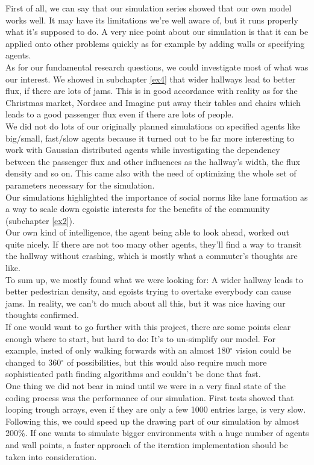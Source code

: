 
First of all, we can say that our simulation series showed that our own model works well. It may have its limitations we're well aware of, but it runs properly what it's supposed to do.
A very nice point about our simulation is that it can be applied onto other problems quickly as for example by adding walls or specifying agents.\\

\noi As for our fundamental research questions, we could investigate most of what was our interest. We showed in subchapter \ref{ex4} that wider hallways lead to better flux, if there are lots of jams. This is in good accordance with reality as for the Christmas market, Nordsee and Imagine put away their tables and chairs which leads to a good passenger flux even if there are lots of people.\\
We did not do lots of our originally planned simulations on specified agents like big/small, fast/slow agents because it turned out to be far more interesting to work with Gaussian distributed agents while investigating the dependency between the passenger flux and other influences as the hallway's width, the flux density and so on. This came also with the need of optimizing the whole set of parameters necessary for the simulation.\\
Our simulations highlighted the importance of social norms like lane formation as a way to scale down egoistic interests for the benefits of the community (subchapter \ref{ex2}).\\

Our own kind of intelligence, the agent being able to look ahead, worked out quite nicely. If there are not too many other agents, they'll find a way to transit the hallway without crashing, which is mostly what a commuter's thoughts are like.\\
To sum up, we mostly found what we were looking for: A wider hallway leads to better pedestrian density, and egoists trying to overtake everybody can cause jams. In reality, we can't do much about all this, but it was nice having our thoughts confirmed.\\

\noi If one would want to go further with this project, there are some points clear enough where to start, but hard to do: It's to un-simplify our model. For example, insted of only walking forwards with an almost 180$^\circ$ vision could be changed to 360$^\circ$ of possibilities, but this would also require much more sophisticated path finding algorithms and couldn't be done that fast.\\
One thing we did not bear in mind until we were in a very final state of the coding process was the performance of our simulation. First tests showed that looping trough arrays, even if they are only a few 1000 entries large, is very slow. Following this, we could speed up the drawing part of our simulation by almost 200\%. If one wants to simulate bigger environments with a huge number of agents and wall points, a faster approach of the iteration implementation should be taken into consideration.\\

